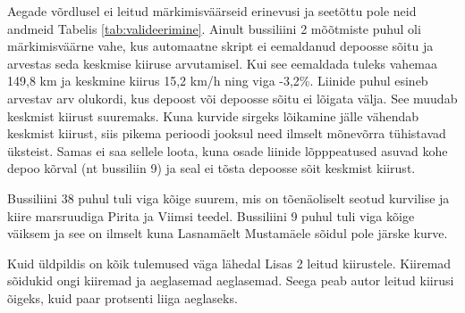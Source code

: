Aegade võrdlusel ei leitud märkimisväärseid erinevusi ja seetõttu pole neid andmeid Tabelis \ref{tab:valideerimine}. Ainult bussiliini 2 mõõtmiste puhul oli märkimisväärne vahe, kus automaatne skript ei eemaldanud depoosse sõitu ja arvestas seda keskmise kiiruse arvutamisel. Kui see eemaldada tuleks vahemaa 149,8 km ja keskmine kiirus 15,2 km/h ning viga -3,2\%.
Liinide puhul esineb arvestav arv olukordi, kus depoost või depoosse sõitu ei lõigata välja. See muudab keskmist kiirust suuremaks. Kuna kurvide sirgeks lõikamine jälle vähendab keskmist kiirust, siis pikema perioodi jooksul need ilmselt mõnevõrra tühistavad üksteist. Samas ei saa sellele loota, kuna osade liinide lõpppeatused asuvad kohe depoo kõrval (nt bussiliin 9) ja seal ei tõsta depoosse sõit keskmist kiirust.

Bussiliini 38 puhul tuli viga kõige suurem, mis on tõenäoliselt seotud kurvilise ja kiire marsruudiga Pirita ja Viimsi teedel. Bussiliini 9 puhul tuli viga kõige väiksem ja see on ilmselt kuna Lasnamäelt Mustamäele sõidul pole järske kurve. 

Kuid üldpildis on kõik tulemused väga lähedal Lisas 2 leitud kiirustele. Kiiremad sõidukid ongi kiiremad ja aeglasemad aeglasemad. Seega peab autor leitud kiirusi õigeks, kuid paar protsenti liiga aeglaseks.
